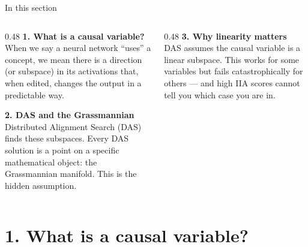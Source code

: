 \documentclass[aspectratio=169,11pt]{beamer}
\begin{document}

\begin{frame}[plain]
\vfill
\begin{center}
  \setlength{\fboxrule}{2.5pt}%
\end{center}
\vfill
\end{frame}

\begin{frame}{In this section}
\begin{columns}[T]
\begin{column}{0.48\textwidth}
\textbf{1. What is a causal variable?}\\[0.2em]
{\small When we say a neural network ``uses'' a concept, we mean there is a direction (or subspace) in its activations that, when edited, changes the output in a predictable way.}

\vspace{0.6em}
\textbf{2. DAS and the Grassmannian}\\[0.2em]
{\small Distributed Alignment Search (DAS) finds these subspaces. Every DAS solution is a point on a specific mathematical object: the Grassmannian manifold. This is the hidden assumption.}
\end{column}
\begin{column}{0.48\textwidth}
\textbf{3. Why linearity matters}\\[0.2em]
{\small DAS assumes the causal variable is a linear subspace. This works for some variables but fails catastrophically for others --- and high IIA scores cannot tell you which case you are in.}
\end{column}
\end{columns}
\end{frame}


\section{1. What is a causal variable?}
\end{document}
